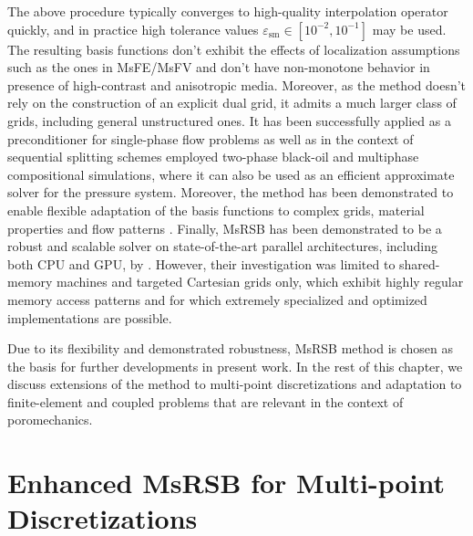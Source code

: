The above procedure typically converges to high-quality interpolation operator quickly, and in practice high tolerance values $\varepsilon_{\text{sm}} \in [10^{-2}, 10^{-1}]$ may be used.   The resulting basis functions don't exhibit the effects of localization assumptions such as the ones in MsFE/MsFV and don't have non-monotone behavior in presence of high-contrast and anisotropic media.   Moreover, as the method doesn't rely on the construction of an explicit dual grid, it admits a much larger class of grids, including general unstructured ones.   It has been successfully applied as a preconditioner for single-phase flow problems \cite{Moyner2016} as well as in the context of sequential splitting schemes employed two-phase black-oil \cite{Moyner2016,Moyner2016a} and multiphase compositional \cite{Moyner2017} simulations, where it can also be used as an efficient approximate solver for the pressure system.   Moreover, the method has been demonstrated to enable flexible adaptation of the basis functions to complex grids, material properties and flow patterns \cite{Lie2017,Klemetsdal2020}.   Finally, MsRSB has been demonstrated to be a robust and scalable solver on state-of-the-art parallel architectures, including both CPU and GPU, by \cite{Manea2021,Manea2022}.   However, their investigation was limited to shared-memory machines and targeted Cartesian grids only, which exhibit highly regular memory access patterns and for which extremely specialized and optimized implementations are possible.

Due to its flexibility and demonstrated robustness, MsRSB method is chosen as the basis for further developments in present work.   In the rest of this chapter, we discuss extensions of the method to multi-point discretizations and adaptation to finite-element and coupled problems that are relevant in the context of poromechanics.

\section{Enhanced MsRSB for Multi-point Discretizations}
\label{sec:enhanced_msrsb}

